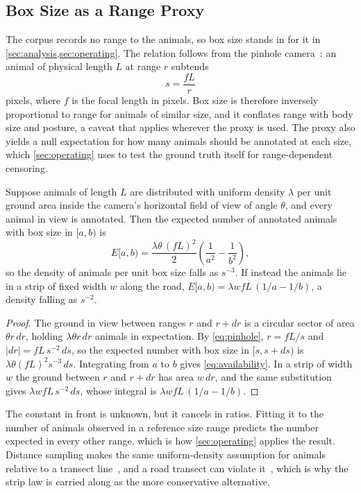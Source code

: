 \subsection{Box Size as a Range Proxy}
\label{sec:rangeproxy}

The corpus records no range to the animals, so box size stands in for it in
\cref{sec:analysis,sec:operating}. The relation follows from the pinhole
camera~\cite{hartley2004multiple}: an animal of physical length $L$ at range $r$ subtends
\begin{equation}
s=\frac{fL}{r}
\label{eq:pinhole}
\end{equation}
pixels, where $f$ is the focal length in pixels. Box size is therefore inversely
proportional to range for animals of similar size, and it conflates range with body size and
posture, a caveat that applies wherever the proxy is used. The proxy also yields a null
expectation for how many animals should be annotated at each size, which
\cref{sec:operating} uses to test the ground truth itself for range-dependent censoring.

\begin{proposition}
\label{prop:availability}
Suppose animals of length $L$ are distributed with uniform density $\lambda$ per unit ground
area inside the camera's horizontal field of view of angle $\theta$, and every animal in view
is annotated. Then the expected number of annotated animals with box size in $[a,b)$ is
\begin{equation}
E[a,b)=\frac{\lambda\theta\,(fL)^{2}}{2}\left(\frac{1}{a^{2}}-\frac{1}{b^{2}}\right),
\label{eq:availability}
\end{equation}
so the density of animals per unit box size falls as $s^{-3}$. If instead the animals lie
in a strip of fixed width $w$ along the road, $E[a,b)=\lambda w fL\,(1/a-1/b)$, a density
falling as $s^{-2}$.
\end{proposition}
\begin{proof}
The ground in view between ranges $r$ and $r+dr$ is a circular sector of area
$\theta r\,dr$, holding $\lambda\theta r\,dr$ animals in expectation. By \cref{eq:pinhole},
$r=fL/s$ and $|dr|=fL\,s^{-2}\,ds$, so the expected number with box size in $[s,s+ds)$ is
$\lambda\theta (fL)^{2}s^{-3}\,ds$. Integrating from $a$ to $b$ gives
\cref{eq:availability}. In a strip of width $w$ the ground between $r$ and $r+dr$ has area
$w\,dr$, and the same substitution gives $\lambda w fL\,s^{-2}\,ds$, whose integral is
$\lambda w fL\,(1/a-1/b)$.
\end{proof}

The constant in front is unknown, but it cancels in ratios. Fitting it to the number of
animals observed in a reference size range predicts the number expected in every other
range, which is how \cref{sec:operating} applies the result. Distance sampling makes the
same uniform-density assumption for animals relative to a transect
line~\cite{buckland2015distance,thomas2010distance}, and a road transect can violate
it~\cite{diefenbach2025accounting}, which is why the strip law is carried along as the more
conservative alternative.
